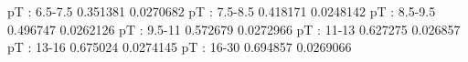 pT : 6.5-7.5
0.351381 0.0270682
pT : 7.5-8.5
0.418171 0.0248142
pT : 8.5-9.5
0.496747 0.0262126
pT : 9.5-11
0.572679 0.0272966
pT : 11-13
0.627275 0.026857
pT : 13-16
0.675024 0.0274145
pT : 16-30
0.694857 0.0269066
